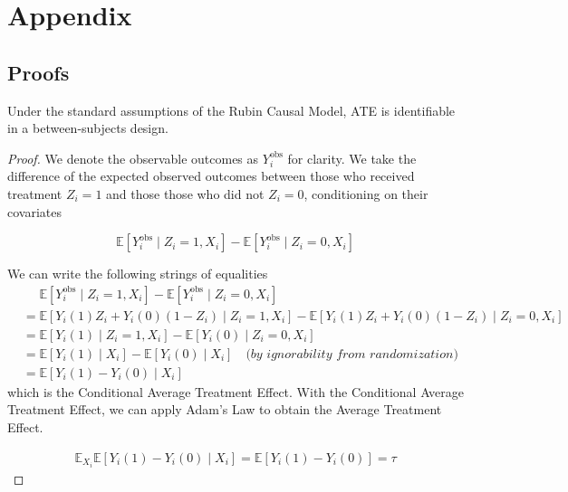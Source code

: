 \section*{Appendix}

\subsection*{Proofs}

\begin{retheorem}
    Under the standard assumptions of the Rubin Causal Model, ATE is identifiable in a between-subjects design.
\end{retheorem}

\begin{proof}
    We denote the observable outcomes as $Y_i^{\text{obs}}$ for clarity. We take the difference of the expected observed outcomes between those who received treatment $Z_i = 1$ and those those who did not $Z_i = 0$, conditioning on their covariates
    
    \[\mathbb{E}[Y_{i}^{\text{obs}} \mid Z_i = 1, X_i] - \mathbb{E}[Y_{i}^{\text{obs}} \mid Z_i = 0, X_i]\] 
 
    We can write the following strings of equalities
    \[
        \begin{aligned}
            &\quad \,\,\mathbb{E}[Y_{i}^{\text{obs}} \mid Z_i = 1, X_i] - \mathbb{E}[Y_{i}^{\text{obs}} \mid Z_i = 0, X_i] \\
            &= \mathbb{E}[Y_i(1)Z_i + Y_i(0)(1 - Z_i) \mid Z_i = 1, X_i] - \mathbb{E}[Y_i(1)Z_i + Y_i(0)(1 - Z_i) \mid Z_i = 0, X_i] \\
            &= \mathbb{E}[Y_i(1) \mid Z_i = 1, X_i] - \mathbb{E}[Y_i(0) \mid Z_i = 0, X_i] \\
            &= \mathbb{E}[Y_i(1) \mid X_i] - \mathbb{E}[Y_i(0) \mid X_i] \quad \textit{(by ignorability from randomization)} \\ 
            &= \mathbb{E}[Y_i(1) - Y_i(0) \mid X_i] 
        \end{aligned}
    \] which is the Conditional Average Treatment Effect. With the Conditional Average Treatment Effect, we can apply Adam's Law to obtain the Average Treatment Effect.

    \[\begin{aligned}
        \mathbb{E}_{X_i}\mathbb{E}[Y_i(1) - Y_i(0) \mid X_i] =  \mathbb{E}[Y_i(1) - Y_i(0)]  = \tau
    \end{aligned}\]
\end{proof}

